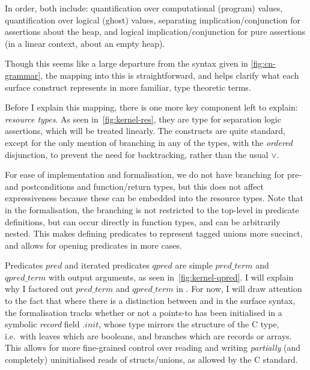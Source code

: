 In order, both include: quantification over computational (program) values,
quantification over logical (ghost) values, separating implication/conjunction
for assertions about the heap, and logical
implication/conjunction for pure assertions (in a linear context, about an
empty heap).

Though this seems like a large departure from the syntax given in
\cref{fig:cn-grammar}, the mapping into this is straightforward, and helps
clarify what each  surface construct represents in more familiar,
type theoretic terms.

Before I explain this mapping, there is one more key component left to explain:
\emph{resource types}. As seen in~\cref{fig:kernel-res}, they are type for
separation logic assertions, which will be treated linearly. The constructs are
quite standard, except for the only mention of branching in any of the types,
with the \emph{ordered} disjunction, to prevent the need for backtracking,
rather than the usual $\vee{}$.

For ease of implementation and formalisation, we do not have branching for pre-
and postconditions and function/return types, but this does not affect
expressiveness because these can be embedded into the resource types. Note that
in the formalisation, the branching is not restricted to the top-level in
predicate definitions, but can occur directly in function types, and can be
arbitrarily nested. This makes defining predicates to represent tagged unions
more succinct, and allows for opening predicates in more cases.


Predicates ${pred}$ and iterated predicates ${qpred}$ are simple ${pred\_term}$
and ${qpred\_term}$ with output arguments, as seen in~\cref{fig:kernel-qpred}.
I will explain why I factored out ${pred\_term}$ and ${qpred\_term}$ in
. For now, I will draw attention to the fact that
where there is a distinction between  and  in
the surface syntax, the formalisation tracks whether or not a points-to has
been initialised in a symbolic \emph{record} field ${.init}$, whose type
mirrors the structure of the C type, i.e.\ with leaves which are booleans, and
branches which are records or arrays. This allows for more fine-grained control
over reading and writing \emph{partially} (and completely) uninitialised reads
of structs/unions, as allowed by the C standard.

